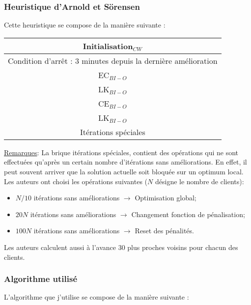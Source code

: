 \documentclass[a4paper,11pt]{article}%
\begin{document}
\subsubsection{Heuristique d'Arnold et Sörensen}

Cette heuristique se compose de la manière suivante :


\begin{center}
\begin{tabular}{|c|}

   \hline
   Initialisation$_{CW}$  \\
   \hline
   \hline
   Condition d'arrêt : 3 minutes depuis la dernière amélioration  \\
   \hline
   EC$_{BI-O}$ \\
   \hline
   LK$_{BI-O}$ \\
   \hline
   CE$_{BI-O}$ \\
   \hline
   LK$_{BI-O}$ \\
   \hline
   Itérations spéciales \\
   \hline
   \hline
   
\end{tabular}
\end{center}

\underline{Remarques}: La brique itérations spéciales, contient des opérations qui ne sont effectuées qu'après un certain nombre d'itérations sans améliorations. En effet, il peut souvent arriver que la solution actuelle soit bloquée sur un optimum local. Les auteurs ont choisi les opérations suivantes ($N$ désigne le nombre de clients):
\begin{itemize}
\item $N/10$ itérations sans améliorations $\rightarrow$ Optimisation global;
\item $20N$ itérations sans améliorations $\rightarrow$ Changement fonction de pénalisation;
\item $100N$ itérations sans améliorations $\rightarrow$ Reset des pénalités.
\end{itemize} 

Les auteurs calculent aussi à l'avance $30$ plus proches voisins pour chacun des clients.

\subsubsection{Algorithme utilisé}

L'algorithme que j'utilise se compose de la manière suivante :
\end{document}

